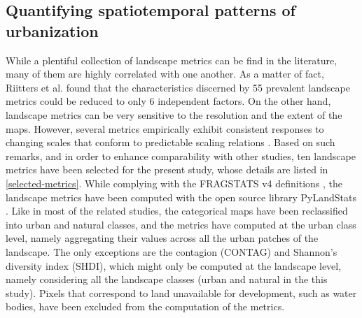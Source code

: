 \documentclass[10pt,letterpaper]{article}
\begin{document}
\subsection*{Quantifying spatiotemporal patterns of urbanization}

While a plentiful collection of landscape metrics can be find in the literature, many of them are highly correlated with one another. As a matter of fact, Riitters et al. \cite{riitters1995factor} found that the characteristics discerned by 55 prevalent landscape metrics could be reduced to only 6 independent factors.
On the other hand, landscape metrics can be very sensitive to the resolution and the extent of the maps. However, several metrics empirically exhibit consistent responses to changing scales that conform to predictable scaling relations \cite{wu2002empirical, wu2004effects}.
Based on such remarks, and in order to enhance comparability with other studies, ten landscape metrics have been selected for the present study, whose details are listed in \autoref{selected-metrics}.
While complying with the FRAGSTATS v4 definitions \cite{mcgarigal2012fragstats}, the landscape metrics have been computed with the open source library PyLandStats \cite{bosch2019pylandstats}.
Like in most of the related studies, the categorical maps have been reclassified into urban and natural classes, and the metrics have computed at the urban class level, namely aggregating their values across all the urban patches of the landscape. The only exceptions are the contagion (CONTAG) and Shannon's diversity index (SHDI), which might only be computed at the landscape level, namely considering all the landscape classes (urban and natural in the this study).
Pixels that correspond to land unavailable for development, such as water bodies, have been excluded from the computation of the metrics.
\end{document}
